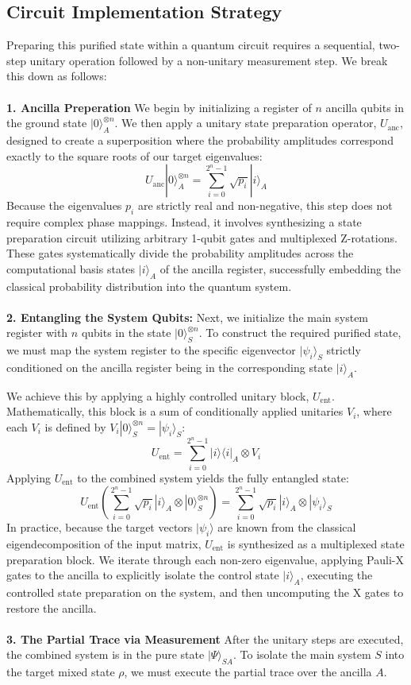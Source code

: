 \documentclass[12pt]{article}
\begin{document}
\subsection{Circuit Implementation Strategy}
Preparing this purified state within a quantum circuit requires a sequential, two-step unitary operation followed by a non-unitary measurement step. We break this down as follows:
\\ \\
\textbf{1. Ancilla Preperation}
We begin by initializing a register of $n$ ancilla qubits in the ground state $|0\rangle^{\otimes n}_A$. We then apply a unitary state preparation operator, $U_{\text{anc}}$, designed to create a superposition where the probability amplitudes correspond exactly to the square roots of our target eigenvalues:
$$
    U_{\text{anc}} |0\rangle^{\otimes n}_A = \sum_{i=0}^{2^n-1} \sqrt{p_i} |i\rangle_A
$$
Because the eigenvalues $p_i$ are strictly real and non-negative, this step does not require complex phase mappings. Instead, it involves synthesizing a state preparation circuit utilizing arbitrary 1-qubit gates and multiplexed Z-rotations. These gates systematically divide the probability amplitudes across the computational basis states $|i\rangle_A$ of the ancilla register, successfully embedding the classical probability distribution into the quantum system.
\\ \\
\textbf{2. Entangling the System Qubits:}
Next, we initialize the main system register with $n$ qubits in the state $|0\rangle^{\otimes n}_S$. To construct the required purified state, we must map the system register to the specific eigenvector $|\psi_i\rangle_S$ strictly conditioned on the ancilla register being in the corresponding state $|i\rangle_A$.

We achieve this by applying a highly controlled unitary block, $U_{\text{ent}}$. Mathematically, this block is a sum of conditionally applied unitaries $V_i$, where each $V_i$ is defined by $V_i|0\rangle^{\otimes n}_S = |\psi_i\rangle_S$:
$$
    U_{\text{ent}} = \sum_{i=0}^{2^n-1} |i\rangle \langle i|_A \otimes V_i
$$
Applying $U_{\text{ent}}$ to the combined system yields the fully entangled state:
$$
    U_{\text{ent}} \left( \sum_{i=0}^{2^n-1} \sqrt{p_i} |i\rangle_A \otimes |0\rangle^{\otimes n}_S \right) = \sum_{i=0}^{2^n-1} \sqrt{p_i} |i\rangle_A \otimes |\psi_i\rangle_S
$$
In practice, because the target vectors $|\psi_i\rangle$ are known from the classical eigendecomposition of the input matrix, $U_{\text{ent}}$ is synthesized as a multiplexed state preparation block. We iterate through each non-zero eigenvalue, applying Pauli-X gates to the ancilla to explicitly isolate the control state $|i\rangle_A$, executing the controlled state preparation on the system, and then uncomputing the X gates to restore the ancilla.
\\ \\
\textbf{3. The Partial Trace via Measurement}
After the unitary steps are executed, the combined system is in the pure state $|\Psi\rangle_{SA}$. To isolate the main system $S$ into the target mixed state $\rho$, we must execute the partial trace over the ancilla $A$.
\end{document}
